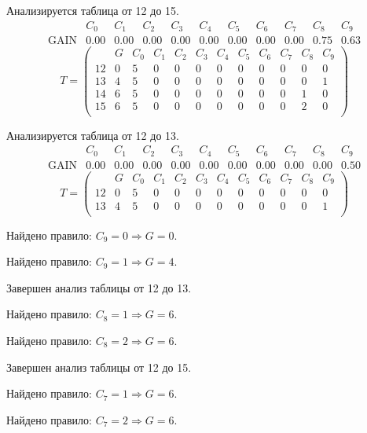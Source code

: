 Анализируется таблица от 12 до 15.
$$ 
\begin{array}{lcccccccc|c|c}
	  & C_{0} & C_{1} & C_{2} & C_{3} & C_{4} & C_{5} & C_{6} & C_{7} & C_{8} & C_{9}\\
 \textrm{GAIN} & 0.00 & 0.00 & 0.00 & 0.00 & 0.00 & 0.00 & 0.00 & 0.00 & 0.75 & 0.63
\end{array}
 $$
$$
T = \left( \begin{array}{lccccccccc|c|c}
	 & G & C_{0} & C_{1} & C_{2} & C_{3} & C_{4} & C_{5} & C_{6} & C_{7} & C_{8} & C_{9}\\
	12 & 0 & 5 & 0 & 0 & 0 & 0 & 0 & 0 & 0 & 0 & 0\\
	13 & 4 & 5 & 0 & 0 & 0 & 0 & 0 & 0 & 0 & 0 & 1\\
	14 & 6 & 5 & 0 & 0 & 0 & 0 & 0 & 0 & 0 & 1 & 0\\
	15 & 6 & 5 & 0 & 0 & 0 & 0 & 0 & 0 & 0 & 2 & 0\\
\end{array} \right)
$$

Анализируется таблица от 12 до 13.
$$ 
\begin{array}{lccccccccc|c|}
	  & C_{0} & C_{1} & C_{2} & C_{3} & C_{4} & C_{5} & C_{6} & C_{7} & C_{8} & C_{9}\\
 \textrm{GAIN} & 0.00 & 0.00 & 0.00 & 0.00 & 0.00 & 0.00 & 0.00 & 0.00 & 0.00 & 0.50
\end{array}
 $$
$$
T = \left( \begin{array}{lcccccccccc|c|}
	 & G & C_{0} & C_{1} & C_{2} & C_{3} & C_{4} & C_{5} & C_{6} & C_{7} & C_{8} & C_{9}\\
	12 & 0 & 5 & 0 & 0 & 0 & 0 & 0 & 0 & 0 & 0 & 0\\
	13 & 4 & 5 & 0 & 0 & 0 & 0 & 0 & 0 & 0 & 0 & 1\\
\end{array} \right)
$$

Найдено правило: $C_{9} = 0 \Longrightarrow G = 0$.

Найдено правило: $C_{9} = 1 \Longrightarrow G = 4$.

Завершен анализ таблицы от 12 до 13.

Найдено правило: $C_{8} = 1 \Longrightarrow G = 6$.

Найдено правило: $C_{8} = 2 \Longrightarrow G = 6$.

Завершен анализ таблицы от 12 до 15.

Найдено правило: $C_{7} = 1 \Longrightarrow G = 6$.

Найдено правило: $C_{7} = 2 \Longrightarrow G = 6$.

